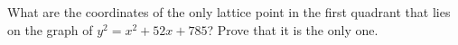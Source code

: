 What are the coordinates of the only lattice point in the first quadrant that lies on the graph of $y^2=x^2+52x+785$? Prove that it is the only one.

